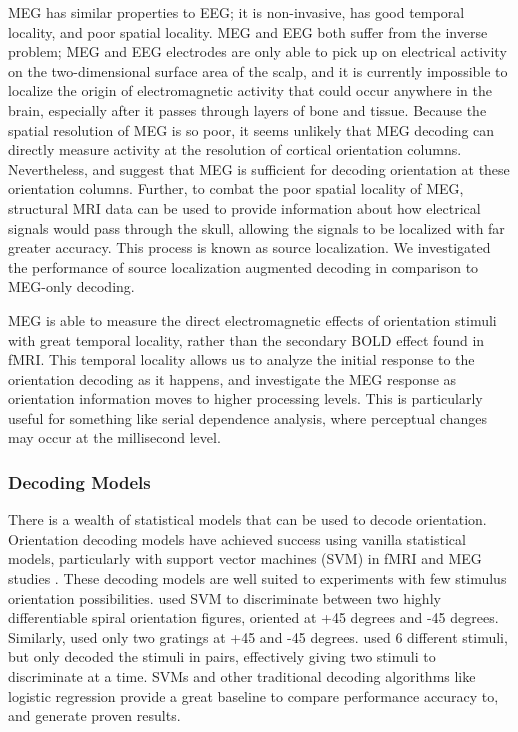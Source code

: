 \documentclass[../main.tex]{subfiles}
\begin{document}
MEG has similar properties to EEG; it is non-invasive, has good temporal locality, and poor spatial locality. MEG and EEG both suffer from the inverse problem; MEG and EEG electrodes are only able to pick up on electrical activity on the two-dimensional surface area of the scalp, and it is currently impossible to localize the origin of electromagnetic activity that could occur anywhere in the brain, especially after it passes through layers of bone and tissue. Because the spatial resolution of MEG is so poor, it seems unlikely that MEG decoding can directly measure activity at the resolution of cortical orientation columns. Nevertheless, \cite{cichy_ramirez_pantazis_2015} and \cite{ pantazis_fang_qin_mohsenzadeh_li_cichy_2018} suggest that MEG is sufficient for decoding orientation at these orientation columns. Further, to combat the poor spatial locality of MEG, structural MRI data can be used to provide information about how electrical signals would pass through the skull, allowing the signals to be localized with far greater accuracy. This process is known as source localization. We investigated the performance of source localization augmented decoding in comparison to MEG-only decoding.

MEG is able to measure the direct electromagnetic effects of orientation stimuli with great temporal locality, rather than the secondary BOLD effect found in fMRI. This temporal locality allows us to analyze the initial response to the orientation decoding as it happens, and investigate the MEG response as orientation information moves to higher processing levels. This is particularly useful for something like serial dependence analysis, where perceptual changes may occur at the millisecond level. 

\subsubsection*{Decoding Models}
There is a wealth of statistical models that can be used to decode orientation. Orientation decoding models have achieved success using vanilla statistical models, particularly with support vector machines (SVM) in fMRI \citep{mannion_mcdonald_clifford_2009} and MEG studies \citep{cichy_ramirez_pantazis_2015, pantazis_fang_qin_mohsenzadeh_li_cichy_2018}. These decoding models are well suited to experiments with few stimulus orientation possibilities. \cite{mannion_mcdonald_clifford_2009} used SVM to discriminate between two highly differentiable spiral orientation figures, oriented at +45 degrees and -45 degrees. Similarly, \cite{cichy_ramirez_pantazis_2015} used only two gratings at +45 and -45 degrees. \cite{pantazis_fang_qin_mohsenzadeh_li_cichy_2018} used 6 different stimuli, but only decoded the stimuli in pairs, effectively giving two stimuli to discriminate at a time. SVMs and other traditional decoding algorithms like logistic regression provide a great baseline to compare performance accuracy to, and generate proven results.
\end{document}
